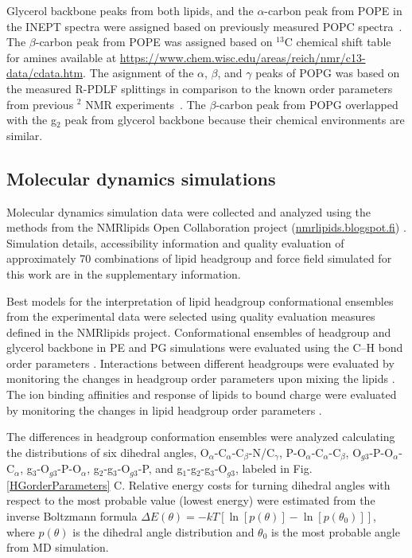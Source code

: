 \documentclass[aps,prl,superscriptaddress,twocolumn]{revtex4}
\begin{document}
Glycerol backbone peaks from both lipids, and the $\alpha$-carbon peak from POPE in the INEPT spectra 
were assigned based on previously measured POPC spectra~\cite{ferreira13}.
The $\beta$-carbon peak from POPE was assigned based on $^{13}$C chemical shift table for amines available
at \url{https://www.chem.wisc.edu/areas/reich/nmr/c13-data/cdata.htm}. The asignment of the $\alpha$, $\beta$, and $\gamma$ peaks of POPG was based on the measured R-PDLF splittings in comparison to the known order parameters from previous $^2$ NMR experiments~\cite{borle85,wohlgemuth80}.   
The $\beta$-carbon peak from POPG overlapped with the g$_2$ peak from glycerol backbone
because their chemical environments are similar.

\subsection{Molecular dynamics simulations}

Molecular dynamics simulation data were collected and analyzed using
the methods from the NMRlipids Open Collaboration project (\url{nmrlipids.blogspot.fi}) \cite{botan15,catte16,ollila16,antila19}.
Simulation details, accessibility information and quality evaluation of approximately 70 combinations of lipid headgroup and force field simulated for this work are in the supplementary information.

Best models for the interpretation of lipid headgroup conformational ensembles from the experimental data were selected
using quality evaluation measures defined in the NMRlipids project.
Conformational ensembles of headgroup and glycerol backbone in PE and PG simulations were evaluated using the C--H bond order parameters \cite{botan15}. Interactions between different headgroups were evaluated by monitoring the changes in headgroup order parameters upon mixing the lipids \cite{antila19}. The ion binding affinities and response of lipids to bound charge were evaluated by monitoring the changes in lipid headgroup order parameters \cite{catte16,antila19}.

The differences in headgroup conformation ensembles were analyzed calculating the distributions of six dihedral angles, O$_\alpha$-C$_\alpha$-C$_\beta$-N/C$_\gamma$, P-O$_\alpha$-C$_\alpha$-C$_\beta$, O$_{g3}$-P-O$_\alpha$-C$_\alpha$, g$_3$-O$_{g3}$-P-O$_\alpha$, g$_2$-g$_3$-O$_{g3}$-P, and g$_1$-g$_2$-g$_3$-O$_{g3}$, labeled in Fig. \ref{HGorderParameters} C. Relative energy costs for turning dihedral angles with respect to the most probable value (lowest energy) were estimated from the inverse Boltzmann formula $\Delta E(\theta) = -kT \left[\ln\left[p(\theta)\right]-\ln\left[p(\theta_0)\right] \right]$, where $p(\theta)$ is the dihedral angle distribution and $\theta_0$ is the most probable angle from MD simulation.
\end{document}
